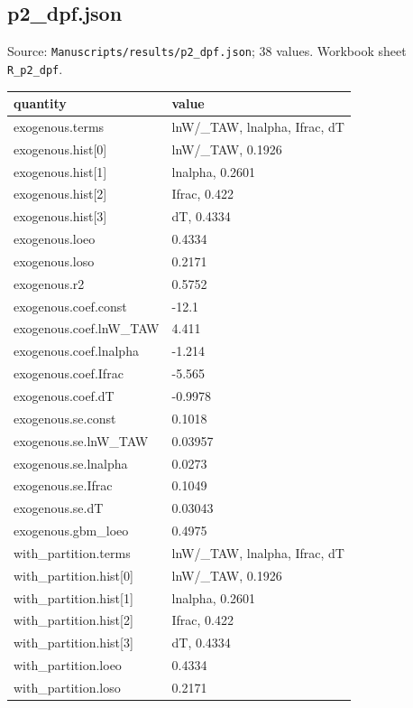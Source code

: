 \subsection*{p2\_dpf.json}
\noindent\small Source: \nolinkurl{Manuscripts/results/p2_dpf.json}; 38 values. Workbook sheet \texttt{R\_p2\_dpf}.\par
{\scriptsize\begin{longtable}{p{}p{}}\toprule\textbf{quantity} & \textbf{value}\\\midrule\endhead
{}exogenous.terms & lnW/\_TAW, lnalpha, Ifrac, dT\\
{}exogenous.hist[0] & lnW/\_TAW, 0.1926\\
{}exogenous.hist[1] & lnalpha, 0.2601\\
{}exogenous.hist[2] & Ifrac, 0.422\\
{}exogenous.hist[3] & dT, 0.4334\\
{}exogenous.loeo & 0.4334\\
{}exogenous.loso & 0.2171\\
{}exogenous.r2 & 0.5752\\
{}exogenous.coef.const & -12.1\\
{}exogenous.coef.lnW\_TAW & 4.411\\
{}exogenous.coef.lnalpha & -1.214\\
{}exogenous.coef.Ifrac & -5.565\\
{}exogenous.coef.dT & -0.9978\\
{}exogenous.se.const & 0.1018\\
{}exogenous.se.lnW\_TAW & 0.03957\\
{}exogenous.se.lnalpha & 0.0273\\
{}exogenous.se.Ifrac & 0.1049\\
{}exogenous.se.dT & 0.03043\\
{}exogenous.gbm\_loeo & 0.4975\\
{}with\_partition.terms & lnW/\_TAW, lnalpha, Ifrac, dT\\
{}with\_partition.hist[0] & lnW/\_TAW, 0.1926\\
{}with\_partition.hist[1] & lnalpha, 0.2601\\
{}with\_partition.hist[2] & Ifrac, 0.422\\
{}with\_partition.hist[3] & dT, 0.4334\\
{}with\_partition.loeo & 0.4334\\
{}with\_partition.loso & 0.2171\\

\end{longtable}}
